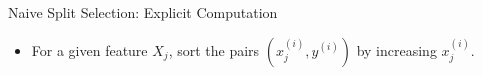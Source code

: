 \documentclass[10pt,compress,t,notes=noshow, xcolor=table]{beamer}
\begin{document}
\begin{frame}{Naive Split Selection: Explicit Computation}
\begin{itemize}
  \item For a given feature \( X_j \), sort the pairs \( (x_j^{(i)}, y^{(i)}) \) by increasing \( x_j^{(i)} \).


\end{itemize}
\end{frame}
\end{document}
